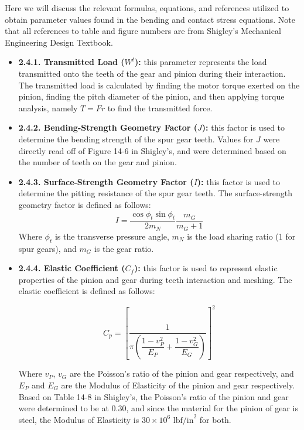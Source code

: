\documentclass[letterpaper,12pt]{article}
\begin{document}
\noindent Here we will discuss the relevant formulas, equations, and references utilized to obtain parameter values found in the bending and contact stress equations. Note that all references to table and figure numbers are from Shigley's Mechanical Engineering Design Textbook.
\begin{itemize}[leftmargin=3mm]
    \item \textbf{2.4.1. Transmitted Load ($W^t$):} this parameter represents the load transmitted onto the teeth of the gear and pinion during their interaction. The transmitted load is calculated by finding the motor torque exerted on the pinion, finding the pitch diameter of the pinion, and then applying torque analysis, namely $T = Fr$ to find the transmitted force.
    
    \item \textbf{2.4.2. Bending-Strength Geometry Factor ($J$):} this factor is used to determine the bending strength of the spur gear teeth. Values for $J$ were directly read off of Figure 14-6 in Shigley's, and were determined based on the number of teeth on the gear and pinion.
    
    \item \textbf{2.4.3. Surface-Strength Geometry Factor ($I$):} this factor is used to determine the pitting resistance of the spur gear teeth. The surface-strength geometry factor is defined as follows:
    \begin{equation}
        I = \dfrac{\cos\phi_t \sin\phi_t}{2m_N} \dfrac{m_G}{m_G + 1}
    \end{equation}
    Where $\phi_t$ is the transverse pressure angle, $m_N$ is the load sharing ratio (1 for spur gears), and $m_G$ is the gear ratio.
    
    \item \textbf{2.4.4. Elastic Coefficient ($C_f$):} this factor is used to represent elastic properties of the pinion and gear during teeth interaction and meshing. The elastic coefficient is defined as follows:
    
    \begin{equation}
        C_p = \left[\dfrac{1}{\pi \left(\dfrac{1-v_P^2}{E_P} + \dfrac{1 - v_G^2}{E_G}\right)}\right]^2
    \end{equation}
    
    Where $v_P$, $v_G$ are the Poisson's ratio of the pinion and gear respectively, and $E_P$ and $E_G$ are the Modulus of Elasticity of the pinion and gear respectively. Based on Table 14-8 in Shigley's, the Poisson's ratio of the pinion and gear were determined to be at 0.30, and since the material for the pinion of gear is steel, the Modulus of Elasticity is $30 \times 10^6$ $\text{lbf/in}^2$ for both. 
    

\end{itemize}
\end{document}
